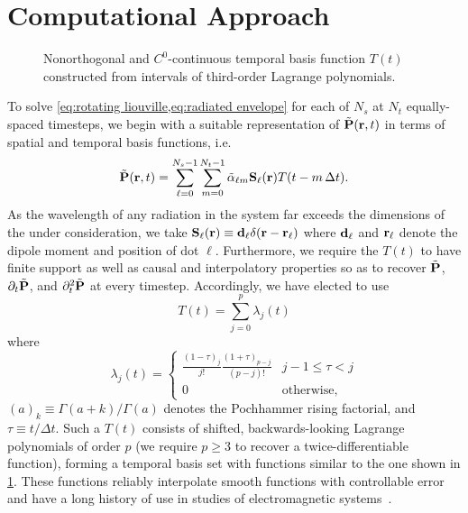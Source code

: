 \section{\label{section:computational approach}Computational Approach}

\begin{figure}
  
  \caption{\label{fig:interpolation basis} Nonorthogonal and $C^0$-continuous temporal basis function $T(t)$ constructed from intervals of third-order Lagrange polynomials.}
\end{figure}
To solve \cref{eq:rotating liouville,eq:radiated envelope} for each of $N_s$ \qds{} at $N_t$ equally-spaced timesteps, we begin with a suitable representation of $\tilde{\vb{P}}(\vb{r}, t)$ in terms of spatial and temporal basis functions, i.e.~
\begin{equation}
  \tilde{\vb{P}}(\vb{r}, t) = \sum_{\ell=0}^{N_s - 1} \sum_{m = 0}^{N_t - 1} \tilde{\alpha}_{\ell m} \vb{S}_\ell(\vb{r}) T(t - m \, \Delta t).
  \label{eq:basis function representation}
\end{equation}
As the wavelength of any radiation in the system far exceeds the dimensions of the \qds{} under consideration, we take $\vb{S}_\ell(\vb{r}) \equiv \vb{d}_\ell \delta(\vb{r} - \vb{r}_\ell)$ where $\vb{d}_\ell$ and $\vb{r}_\ell$ denote the dipole moment and position of dot $\ell$.
Furthermore, we require the $T(t)$ to have finite support as well as causal and interpolatory properties so as to recover $\tilde{\vb{P}}$, $\partial_t \tilde{\vb{P}}$, and $\partial^2_t \tilde{\vb{P}}$ at every timestep.
Accordingly, we have elected to use
\begin{equation}
  T(t) = \sum_{j = 0}^p \lambda_j(t)
  \label{eq:basis sum}
\end{equation}
where
\begin{equation}
  \lambda_j(t) =
  \begin{cases}
    \frac{(1 - \tau)_j}{j!} \frac{(1 + \tau)_{p-j}}{(p-j)!} & j-1 \le \tau < j \\
    0 & \text{otherwise,}
  \end{cases}
  \label{eq:basis piece}
\end{equation}
$(a)_k \equiv \Gamma(a + k)/\Gamma(a)$ denotes the Pochhammer rising factorial, and $\tau \equiv t/\Delta t$.
Such a $T(t)$ consists of shifted, backwards-looking Lagrange polynomials of order $p$ (we require $p \ge 3$ to recover a twice-differentiable function), forming a temporal basis set with functions similar to the one shown in \cref{fig:interpolation basis}.
These functions  reliably interpolate smooth functions with controllable error and have a long history of use in studies of electromagnetic systems~\cite{Manara1997,Bluck1997}.

